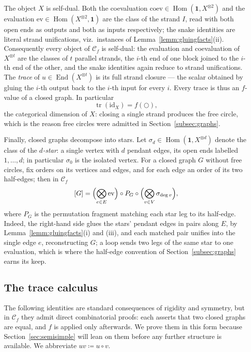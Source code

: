 \documentclass[11pt]{article}
\newcommand{\freecircle}{\bigcirc}
\newcommand{\strand}{I}                           %
\newcommand{\conncat}{\mathcal{C}_{f}}            %
\newcommand{\unitobj}{\mathbf{1}}                 %
\newcommand{\genX}{X}                             %
\newcommand{\End}{\operatorname{End}}
\newcommand{\Hom}{\operatorname{Hom}}
\newcommand{\tr}{\operatorname{tr}}
\begin{document}
The object $\genX$ is self-dual. Both the coevaluation
$\mathrm{coev}\in\Hom(\unitobj,\genX^{\otimes2})$ and the evaluation
$\mathrm{ev}\in\Hom(\genX^{\otimes2},\unitobj)$ are the class of the
strand $\strand$, read with both open ends as outputs and both as
inputs respectively; the snake identities are literal strand
unifications, viz.\ instances of Lemma~\ref{lemm:gluingfacts}(ii).
Consequently every object of $\conncat$ is self-dual: the
evaluation and coevaluation of $\genX^{\otimes t}$ are the classes
of $t$ parallel strands, the $i$-th end of one block joined to the
$i$-th end of the other, and the snake identities again reduce to
strand unifications. The \emph{trace} of
$u\in\End(\genX^{\otimes t})$ is its full strand closure --- the
scalar obtained by gluing the $i$-th output back to the $i$-th
input for every $i$. Every trace is thus an $f$-value of a closed
graph. In particular
\[
\tr(\mathrm{id}_{\genX})=f(\freecircle),
\]
the categorical dimension of $\genX$: closing a single strand
produces the free circle, which is the reason free circles were
admitted in Section~\ref{subsec:graphs}.

Finally, closed graphs decompose into stars. Let
$\sigma_{d}\in\Hom(\unitobj,\genX^{\otimes d})$ denote the class of
the \emph{$d$-star}: a single vertex with $d$ pendant edges, its
open ends labelled $1,\dotsc,d$; in particular $\sigma_{0}$ is
the isolated vertex. For a closed graph $G$ without free
circles, fix orders on its vertices and edges, and for each edge
an order of its two half-edges; then in $\conncat$
\begin{equation}\label{eq:stars}
[G]=
\Bigl(\bigotimes_{e\in E}\mathrm{ev}\Bigr)
\circ P_{G}\circ
\Bigl(\bigotimes_{v\in V}\sigma_{\deg v}\Bigr),
\end{equation}
where $P_{G}$ is the permutation fragment matching each star leg to
its half-edge. Indeed, the right-hand side glues the stars' pendant
edges in pairs along $E$, by
Lemma~\ref{lemm:gluingfacts}(i) and (iii), and each matched pair
unifies into the single edge $e$, reconstructing $G$; a loop sends
two legs of the same star to one evaluation, which is where the
half-edge convention of Section~\ref{subsec:graphs} earns its keep.

\subsection{The trace calculus}\label{subsec:tracecalc}

The following identities are standard consequences of rigidity and
symmetry, but in $\conncat$ they admit direct combinatorial proofs:
each asserts that two closed graphs are equal, and $f$ is applied
only afterwards. We prove them in this form because
Section~\ref{sec:semisimple} will lean on them before any further
structure is available. We abbreviate $uv\coloneqq u\circ v$.
\end{document}
